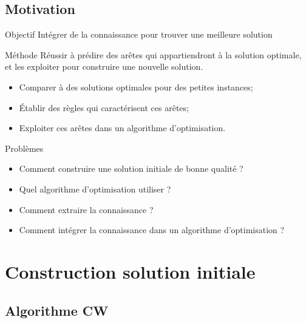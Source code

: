 \documentclass{beamer}
\begin{document}
\subsection{Motivation}

\begin{frame}
\begin{block}{Objectif}
Intégrer de la connaissance pour trouver une meilleure solution
\end{block}

\begin{exampleblock}{Méthode}
Réussir à prédire des arêtes qui appartiendront à la solution optimale, et les exploiter pour construire une nouvelle solution.
\begin{itemize}
\item Comparer à des solutions optimales pour des petites instances;
\item Établir des règles qui caractérisent ces arêtes;
\item Exploiter ces arêtes dans un algorithme d'optimisation.
\end{itemize}
\end{exampleblock}

\begin{alertblock}{Problèmes}
\begin{itemize}
\item Comment construire une solution initiale de bonne qualité ?
\item Quel algorithme d'optimisation utiliser ?
\item Comment extraire la connaissance ?
\item Comment intégrer la connaissance dans un algorithme d'optimisation ?
\end{itemize}
\end{alertblock}
\end{frame}

\section{Construction solution initiale}

\subsection{Algorithme CW}
\end{document}
